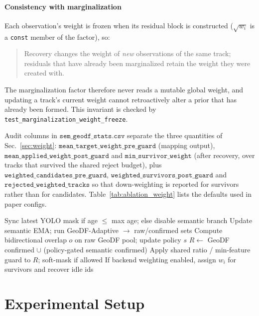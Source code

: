 \documentclass{ieeeaccess}
\begin{document}
\paragraph{Consistency with marginalization}
Each observation's weight is frozen when its residual block is constructed (\(\sqrt{w_i}\) is a \texttt{const} member of the factor), so:
\begin{quote}
Recovery changes the weight of \emph{new} observations of the same track; residuals that have already been marginalized retain the weight they were created with.
\end{quote}
The marginalization factor therefore never reads a mutable global weight, and updating a track's current weight cannot retroactively alter a prior that has already been formed. This invariant is checked by \texttt{test\_marginalization\_weight\_freeze}.

Audit columns in \(\texttt{sem\_geodf\_stats.csv}\) separate the three quantities of Sec.~\ref{sec:weight}: \(\texttt{mean\_target\_weight\_pre\_guard}\) (mapping output), \(\texttt{mean\_applied\_weight\_post\_guard}\) and \(\texttt{min\_survivor\_weight}\) (after recovery, over tracks that survived the shared reject budget), plus \(\texttt{weighted\_candidates\_pre\_guard}\), \(\texttt{weighted\_survivors\_post\_guard}\) and \(\texttt{rejected\_weighted\_tracks}\) so that down-weighting is reported for survivors rather than for candidates.
Table~\ref{tab:ablation_weight} lists the defaults used in paper configs.

\begin{algorithm}[t]
\caption{Sem-GeoDF front-end step (per stereo frame)}
\label{alg:semgeodf}
\begin{algorithmic}[1]
\State Sync latest YOLO mask if age \(\le\) max age; else disable semantic branch
\State Update semantic EMA; run GeoDF-Adaptive \(\to\) raw/confirmed sets
\State Compute bidirectional overlap \(o\) on raw GeoDF pool; update policy \(s\)
\State \(R \gets\) GeoDF confirmed \(\cup\) (policy-gated semantic confirmed)
\State Apply shared ratio / min-feature guard to \(R\); soft-mask if allowed
\State If backend weighting enabled, assign \(w_i\) for survivors and recover idle ids
\end{algorithmic}
\end{algorithm}

\section{Experimental Setup}
\label{sec:setup}
\end{document}
